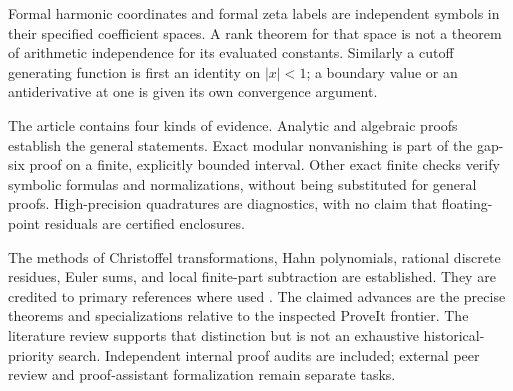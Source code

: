 Formal harmonic coordinates and formal zeta labels are independent
symbols in their specified coefficient spaces. A rank theorem for
that space is not a theorem of arithmetic independence for its
evaluated constants. Similarly a cutoff generating function is
first an identity on $|x|<1$; a boundary value or an antiderivative
at one is given its own convergence argument.

The article contains four kinds of evidence. Analytic and
algebraic proofs establish the general statements. Exact modular
nonvanishing is part of the gap-six proof on a finite, explicitly
bounded interval. Other exact finite checks verify symbolic
formulas and normalizations, without being substituted for general
proofs. High-precision quadratures are diagnostics, with no claim
that floating-point residuals are certified enclosures.

The methods of Christoffel transformations, Hahn polynomials,
rational discrete residues, Euler sums, and local finite-part
subtraction are established. They are credited to primary
references where used \cite{Krattenthaler2023,DLMF,ChenSinger2012,
Xu2017,XuWang2019,ShpotParis2016}. The claimed advances are the
precise theorems and specializations relative to the inspected
ProveIt frontier. The literature review supports that distinction
but is not an exhaustive historical-priority search. Independent
internal proof audits are included; external peer review and
proof-assistant formalization remain separate tasks.


